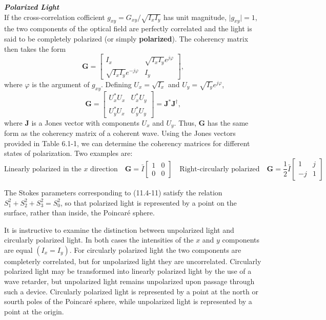 \documentclass{article}
\numberwithin{figure}{subsection}
\numberwithin{table}{subsection}
\begin{document}
\bigbreak\noindent\textcolor{ksc}{\textbf{\textsl{Polarized Light}}}\\
If the cross-correlation cofficient $g_{xy} = G_{xy} / \sqrt{I_x I_y}$ has unit magnitude, $\lvert g_{xy} \rvert = 1$, the two components of the optical field are perfectly correlated and the light is said to be completely polarized (or simply \textbf{polarized}). The coherency matrix then takes the form
\begin{equation}
\mathbf{G} = 
\begin{bmatrix}
I_x & \sqrt{I_x I_y}e^{j\varphi} \\
\sqrt{I_x I_y}e^{-j\varphi} & I_y
\end{bmatrix} ,
\end{equation}
where $\varphi$ is the argument of $g_{xy}$. Defining $U_x = \sqrt{I_x}$ and $U_y = \sqrt{I_y}e^{j\varphi}$,
\begin{equation}
\mathbf{G} =
\begin{bmatrix}
U_x^\ast U_x & U_x^\ast U_y \\
U_y^\ast U_x & U_y^\ast U_y
\end{bmatrix}
= \mathbf{J^\ast J^\dag} ,
\end{equation}
where $\mathbf{J}$ is a Jones vector with components $U_x$ and $U_y$. Thus, $\mathbf{G}$ has the same form as the coherency matrix of a coherent wave. Using the Jones vectors provided in Table 6.1-1, we can determine the coherency matrices for different states of polarization. Two examples are:
\begin{equation*}
\text{Linearly polarized in the $x$ direction} \quad \mathbf{G} = \bar{I}
\begin{bmatrix}
1 & 0 \\
0 & 0 
\end{bmatrix}
\quad \text{Right-circularly polarized} \quad \mathbf{G} = \frac{1}{2}\bar{I}
\begin{bmatrix}
1 & j \\
-j & 1
\end{bmatrix}
\end{equation*}
\par The Stokes parameters corresponding to (11.4-11) satisfy the relation $S_1^2 + S_2^2 + S_3^2 = S_0^2$, so that polarized light is represented by a point on the surface, rather than inside, the Poincar\'{e} sphere.
\par It is instructive to examine the distinction between unpolarized light and circularly polarized light. In both cases the intensities of the $x$ and $y$ components are equal $(I_x = I_y)$. For circularly polarized light the two components are completerly correlated, but for unpolarized light they are uncorrelated. Circularly polarized light may be transformed into linearly polarized light by the use of a wave retarder, but unpolarized light remains unpolarized upon passage through such a device. Circularly polarized light is represented by a point at the north or sourth poles of the Poincar\'{e} sphere, while unpolarized light is represented by a point at the origin.
\end{document}
